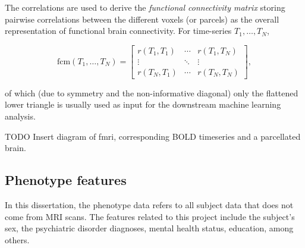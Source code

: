 
The correlations are used to derive the \textit{functional connectivity matrix} storing pairwise correlations between the different voxels (or parcels) as the overall representation of functional brain connectivity. For time-series $T_1, \dots, T_N$,

\begin{equation}
    \mathrm{fcm}(T_1, \dots, T_N) = \begin{bmatrix}
        r(T_1, T_1) & \cdots & r(T_1, T_N) \\
        \vdots & \ddots & \vdots \\
        r(T_N, T_1) & \cdots & r(T_N, T_N)
    \end{bmatrix},
\end{equation}

of which (due to symmetry and the non-informative diagonal) only the flattened lower triangle is usually used as input for the downstream machine learning analysis.

TODO Insert diagram of fmri, corresponding BOLD timeseries and a parcellated brain.



\subsection{Phenotype features}

In this dissertation, the phenotype data refers to all subject data that does not come from MRI scans. The features related to this project include the subject's sex, the psychiatric disorder diagnoses, mental health status, education, among others.


